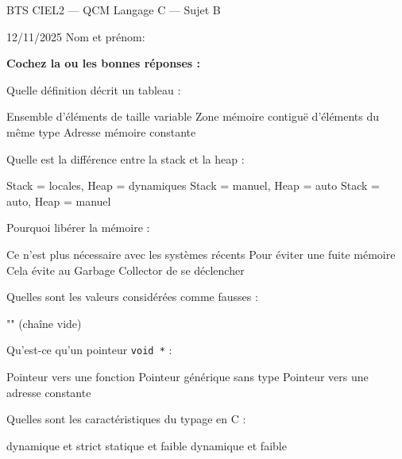 \documentclass[12pt, a4paper]{exam}
\begin{document}
\newpage
\setcounter{page}{1}


\begin{center}
\Large BTS CIEL2 — QCM Langage C — Sujet B
\end{center}
\begin{center}
12/11/2025 \hfill Nom et prénom:\enspace \hrulefill
\end{center}

\textbf{Cochez la ou les bonnes réponses :}

\begin{questions}

\question Quelle définition décrit un tableau :
\begin{checkboxes}
 \choice Ensemble d’éléments de taille variable
 \CorrectChoice Zone mémoire contiguë d’éléments du même type
 \CorrectChoice Adresse mémoire constante
\end{checkboxes}

\question Quelle est la différence entre la stack et la heap :
\begin{checkboxes}
 \CorrectChoice Stack = locales, Heap = dynamiques
 \choice Stack = manuel, Heap = auto
 \CorrectChoice Stack = auto, Heap = manuel
\end{checkboxes}

\question Pourquoi libérer la mémoire :
\begin{checkboxes}
 \choice Ce n'est plus nécessaire avec les systèmes récents
 \CorrectChoice Pour éviter une fuite mémoire
 \choice Cela évite au Garbage Collector de se déclencher
\end{checkboxes}

\question Quelles sont les valeurs considérées comme fausses :
\begin{checkboxes}
 \choice "" (chaîne vide)
\end{checkboxes}

\question Qu’est-ce qu’un pointeur \texttt{void *} :
\begin{checkboxes}
 \choice Pointeur vers une fonction
 \CorrectChoice Pointeur générique sans type
 \choice Pointeur vers une adresse constante
\end{checkboxes}

\question Quelles sont les caractéristiques du typage en C :
\begin{checkboxes}
 \choice dynamique et strict
 \CorrectChoice statique et faible
 \choice dynamique et faible
\end{checkboxes}


\end{questions}
\end{document}
